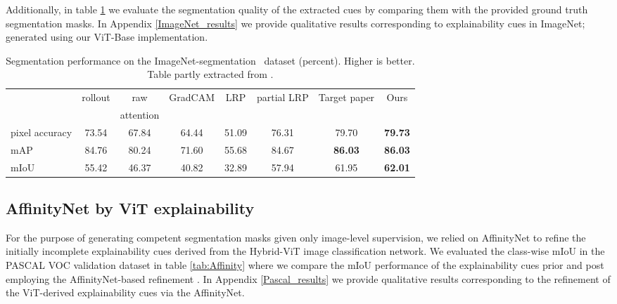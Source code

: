 Additionally, in table \ref{tab:segmentation} we evaluate the segmentation quality of the extracted cues by comparing them with the provided ground truth segmentation masks. In Appendix \ref{ImageNet_results} we provide qualitative results corresponding to explainability cues in ImageNet; generated using our ViT-Base implementation.

\begin{table}[!h]
\centering \begin{adjustbox}{width=0.9\textwidth} \small
    \begin{tabular*}{\linewidth}{@{\extracolsep{\fill}}lccccccc}
        &rollout & raw  & GradCAM & LRP & partial LRP & Target paper & Ours\\
        &~\cite{samira2005} & attention &~\cite{selvaraju2017grad} &~\cite{binder2016layer} &~\cite{voita2019analyzing} &~\cite{mainpaper} & \\
        pixel accuracy & 73.54 & 67.84 & 64.44 & 51.09 & 76.31 & 79.70 & \textbf{79.73}\\
        mAP & 84.76 & 80.24 & 71.60 & 55.68 & 84.67 & \textbf{86.03} & \textbf{86.03}\\
        mIoU & 55.42 & 46.37 & 40.82 & 32.89 & 57.94 & 61.95 & \textbf{62.01}\\
    \end{tabular*}
        \end{adjustbox}
    \caption{Segmentation performance on the ImageNet-segmentation~\cite{imagenet-seg} dataset (percent). Higher is better. Table partly extracted from \cite{mainpaper}.}
    \label{tab:segmentation}
\end{table}

\subsection{AffinityNet by ViT explainability}
For the purpose of generating competent segmentation masks given only image-level supervision, we relied on AffinityNet to refine the initially incomplete explainability cues derived from the Hybrid-ViT image classification network. We evaluated the class-wise mIoU in the PASCAL VOC validation dataset in table \ref{tab:Affinity} where we compare the mIoU performance of the explainability cues prior and post employing the AffinityNet-based refinement \cite{ahn2018learning}. In Appendix \ref{Pascal_results} we provide qualitative results corresponding to the refinement of the ViT-derived explainability cues via the AffinityNet.

